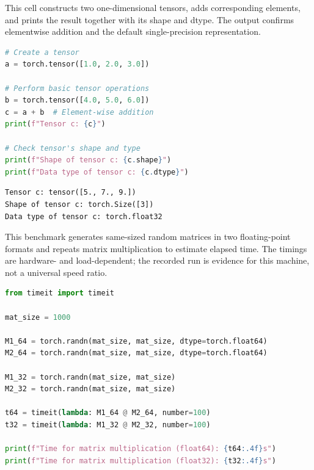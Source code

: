 \documentclass[../labs.tex]{subfiles}
\begin{document}
\label{res:lab01_cell_002}



\noindent This cell constructs two one-dimensional tensors, adds corresponding elements, and prints the result together with its shape and dtype. The output confirms elementwise addition and the default single-precision representation.\par
\begin{lstlisting}[language=Python,basicstyle=\ttfamily\scriptsize,breaklines=true,breakatwhitespace=false,columns=fullflexible,keepspaces=true,numbers=none]
# Create a tensor
a = torch.tensor([1.0, 2.0, 3.0])

# Perform basic tensor operations
b = torch.tensor([4.0, 5.0, 6.0])
c = a + b  # Element-wise addition
print(f"Tensor c: {c}")

# Check tensor's shape and type
print(f"Shape of tensor c: {c.shape}")
print(f"Data type of tensor c: {c.dtype}")
\end{lstlisting}

\label{res:lab01_cell_004}

\begin{lstlisting}[style=terminalOutput]
Tensor c: tensor([5., 7., 9.])
Shape of tensor c: torch.Size([3])
Data type of tensor c: torch.float32
\end{lstlisting}


\noindent This benchmark generates same-sized random matrices in two floating-point formats and repeats matrix multiplication to estimate elapsed time. The timings are hardware- and load-dependent; the recorded run is evidence for this machine, not a universal speed ratio.\par
\begin{lstlisting}[language=Python,basicstyle=\ttfamily\scriptsize,breaklines=true,breakatwhitespace=false,columns=fullflexible,keepspaces=true,numbers=none]
from timeit import timeit

mat_size = 1000

M1_64 = torch.randn(mat_size, mat_size, dtype=torch.float64)
M2_64 = torch.randn(mat_size, mat_size, dtype=torch.float64)

M1_32 = torch.randn(mat_size, mat_size)
M2_32 = torch.randn(mat_size, mat_size)

t64 = timeit(lambda: M1_64 @ M2_64, number=100)
t32 = timeit(lambda: M1_32 @ M2_32, number=100)

print(f"Time for matrix multiplication (float64): {t64:.4f}s")
print(f"Time for matrix multiplication (float32): {t32:.4f}s")
\end{lstlisting}
\end{document}
